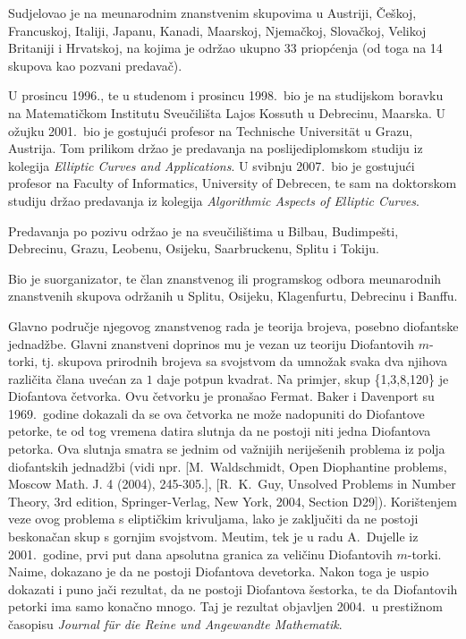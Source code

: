 \documentclass[11pt]{report}
\begin{document}
\medskip

Sudjelovao je na me{\dj}unarodnim znanstvenim skupovima u Austriji,
\v{C}e\v{s}koj, Francuskoj, Italiji, Japanu, Kanadi, Ma{\dj}arskoj, Njema\v{c}koj, Slova\v{c}koj, Velikoj
Britaniji i Hrvatskoj, na kojima je odr\v{z}ao ukupno 33 priop\'{c}enja (od toga na 14 skupova
kao pozvani predava\v{c}).

U prosincu 1996., te u studenom i prosincu 1998.~bio je na
studijskom boravku na Matemati\v{c}kom Institutu Sveu\v{c}ili\v{s}ta Lajos
Kossuth u Debrecinu, Ma{\dj}arska. U o\v{z}ujku 2001.~bio je gostuju\'{c}i
profesor na Technische Universit\"at u Grazu, Austrija. Tom
prilikom dr\v{z}ao je predavanja na poslijediplomskom
studiju iz kolegija {\it Elliptic Curves and Applications}.
U svibnju 2007.~bio je gostuju\'{c}i
profesor na Faculty of Informatics, University of Debrecen,
te sam na doktorskom
studiju dr\v{z}ao predavanja iz kolegija {\it Algorithmic Aspects of Elliptic Curves}.

Predavanja po pozivu odr\v{z}ao je na sveu\v{c}ili\v{s}tima u Bilbau, Budimpe\v{s}ti,
Debrecinu, Grazu, Leobenu, Osijeku, Saarbruckenu, Splitu i Tokiju.

Bio je suorganizator, te \v{c}lan znanstvenog ili programskog odbora me\dj{}unarodnih
znan\-stve\-nih skupova odr\v{z}anih u Splitu, Osijeku, Klagenfurtu, Debrecinu i Banffu.

\medskip

Glavno podru\v{c}je njegovog znanstvenog rada je teorija brojeva,
posebno diofantske jednad\v{z}be. Glavni znanstveni doprinos
mu je vezan uz teoriju Diofantovih $m$-torki, tj. skupova prirodnih
brojeva sa svojstvom da umno\v{z}ak svaka dva njihova
razli\v{c}ita \v{c}lana uve\'{c}an za $1$ daje potpun kvadrat.
Na primjer, skup \{1,3,8,120\} je Diofantova \v{c}etvorka. Ovu
\v{c}etvorku je prona\v{s}ao Fermat. Baker i Davenport su
1969.~godine dokazali da se ova \v{c}etvorka ne mo\v{z}e
nadopuniti do Diofantove petorke, te od tog vremena datira slutnja
da ne postoji niti jedna Diofantova petorka.
Ova slutnja smatra se jednim od va\v{z}nijih nerije\v{s}enih problema iz
polja diofantskih jednad\v{z}bi (vidi npr. [{\sc M.~Waldschmidt},
Open Diophantine problems, Moscow Math. J. 4 (2004), 245-305.],
[R.~K.~Guy, Unsolved Problems in Number Theory, 3rd edition, Springer-Verlag, New York, 2004, Section D29]).
Kori\v{s}tenjem veze ovog problema s elipti\v{c}kim krivuljama,
lako je zaklju\v{c}iti da ne postoji beskona\v{c}an skup s gornjim
svojstvom. Me{\dj}utim, tek je u radu A.~Dujelle iz 2001.~godine,
prvi put dana apsolutna granica za veli\v{c}inu Diofantovih
$m$-torki. Naime, dokazano je da ne postoji Diofantova devetorka.
Nakon toga je uspio dokazati i puno ja\v{c}i rezultat, da
ne postoji Diofantova \v{s}estorka, te da Diofantovih petorki ima
samo kona\v{c}no mnogo. Taj je rezultat objavljen 2004.~u
presti\v{z}nom \v{c}asopisu {\it Journal f\"ur die Reine und Angewandte Mathematik}.
\end{document}
